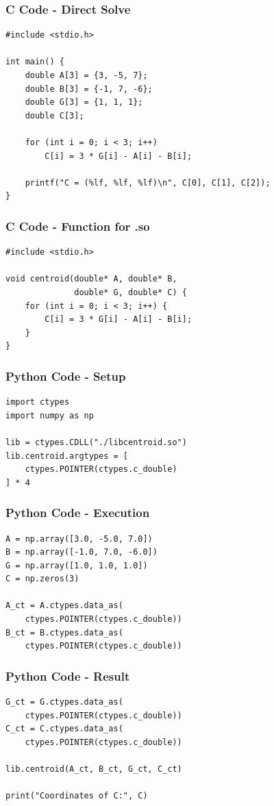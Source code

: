 \documentclass{beamer}
\begin{document}
\begin{frame}[fragile]
\frametitle{C Code - Direct Solve}
\begin{lstlisting}
#include <stdio.h>

int main() {
    double A[3] = {3, -5, 7};
    double B[3] = {-1, 7, -6};
    double G[3] = {1, 1, 1};
    double C[3];

    for (int i = 0; i < 3; i++)
        C[i] = 3 * G[i] - A[i] - B[i];

    printf("C = (%lf, %lf, %lf)\n", C[0], C[1], C[2]);
}
\end{lstlisting}
\end{frame}

\begin{frame}[fragile]
\frametitle{C Code - Function for .so}
\begin{lstlisting}
#include <stdio.h>

void centroid(double* A, double* B,
              double* G, double* C) {
    for (int i = 0; i < 3; i++) {
        C[i] = 3 * G[i] - A[i] - B[i];
    }
}
\end{lstlisting}
\end{frame}

\begin{frame}[fragile]
\frametitle{Python Code - Setup}
\begin{lstlisting}
import ctypes
import numpy as np

lib = ctypes.CDLL("./libcentroid.so")
lib.centroid.argtypes = [
    ctypes.POINTER(ctypes.c_double)
] * 4
\end{lstlisting}
\end{frame}

\begin{frame}[fragile]
\frametitle{Python Code - Execution}
\begin{lstlisting}
A = np.array([3.0, -5.0, 7.0])
B = np.array([-1.0, 7.0, -6.0])
G = np.array([1.0, 1.0, 1.0])
C = np.zeros(3)

A_ct = A.ctypes.data_as(
    ctypes.POINTER(ctypes.c_double))
B_ct = B.ctypes.data_as(
    ctypes.POINTER(ctypes.c_double))
\end{lstlisting}
\end{frame}

\begin{frame}[fragile]
\frametitle{Python Code - Result}
\begin{lstlisting}
G_ct = G.ctypes.data_as(
    ctypes.POINTER(ctypes.c_double))
C_ct = C.ctypes.data_as(
    ctypes.POINTER(ctypes.c_double))

lib.centroid(A_ct, B_ct, G_ct, C_ct)

print("Coordinates of C:", C)
\end{lstlisting}
\end{frame}
\end{document}

